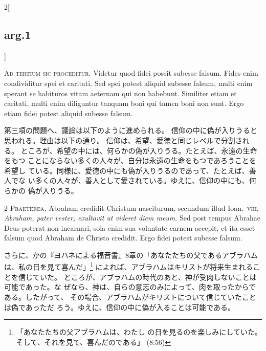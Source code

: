 \documentclass[paper=a4paper,fontsize=10pt,jafontsize=9pt,titlepage]{jlreq}
\begin{document}
\begin{paracol}{2}[\subsection{arg.1}]

{\huge A}{\scshape d tertium sic proceditur}. Videtur
quod fidei possit subesse falsum. Fides enim condividitur spei et
caritati. Sed spei potest aliquid subesse falsum, multi enim sperant se
habituros vitam aeternam qui non habebunt. Similiter etiam et caritati,
multi enim diliguntur tanquam boni qui tamen boni non sunt. Ergo etiam
fidei potest aliquid subesse falsum.

\switchcolumn

第三項の問題へ、議論は以下のように進められる。
信仰の中に偽が入りうると思われる。理由は以下の通り。
信仰は、希望、愛徳と同じレベルで分割される。
ところが、希望の中には、何らかの偽が入りうる。たとえば、永遠の生命をもつ
 ことにならない多くの人々が、自分は永遠の生命をもつであろうことを希望し
 ている。同様に、愛徳の中にも偽が入りうるのであって、たとえば、善人でな
 い多くの人々が、善人として愛されている。ゆえに、信仰の中にも、何らかの
 偽が入りうる。


{\scshape 2 Praeterea}, Abraham credidit Christum nasciturum, secundum
illud Ioan.~{\scshape viii}, {\itshape Abraham, pater vester, exultavit
ut videret diem meum}. Sed post tempus Abrahae Deus poterat non
incarnari, sola enim sua voluntate carnem accepit, et ita esset falsum
quod Abraham de Christo credidit. Ergo fidei potest subesse falsum.

\switchcolumn

さらに、かの『ヨハネによる福音書』8章の「あなたたちの父であるアブラハム
 は、私の日を見て喜んだ」\footnote{「あなたたちの父アブラハムは、わたし
 の日を見るのを楽しみにしていた。そして、それを見て、喜んだのである」
 (8:56)}
によれば、アブラハムはキリストが将来生まれることを信じていた。
ところが、アブラハムの時代のあと、神が受肉しないことは可能であった。な
 ぜなら、神は、自らの意志のみによって、肉を取ったからである。したがって、
 その場合、アブラハムがキリストについて信じていたことは偽であっただ
 ろう。ゆえに、信仰の中に偽が入ることは可能である。



\end{paracol}
\end{document}
